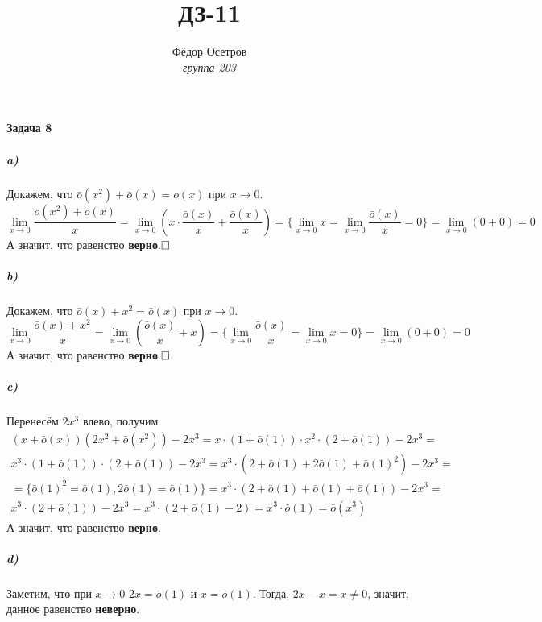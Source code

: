 \documentclass[12pt]{article}
\title{\textbf{ДЗ-11}}
\author{Фёдор Осетров\\ \textit{группа 203}}
\begin{document}
    \maketitle

    \paragraph{Задача 8}
        \subparagraph{a)}
            Докажем, что $\bar{o}(x^2) + \bar{o}(x) = o(x)$ при $x \to 0$.
            \begin{equation*}
                \lim_{x \to 0} \frac{\bar{o}(x^2) + \bar{o}(x)}{x} =
                \lim_{x \to 0} \left(x \cdot \frac{\bar{o}(x)}{x} + \frac{\bar{o}(x)}{x}\right) =
                \{\lim_{x \to 0} x = \lim_{x \to 0} \frac{\bar{o}(x)}{x} = 0\} =
                \lim_{x \to 0} \left(0 + 0\right) = 0
            \end{equation*}
            А значит, что равенство \textbf{верно}.$\hfill\square$
        \subparagraph{b)}
            Докажем, что $\bar{o}(x) + x^2 = \bar{o}(x)$ при $x \to 0$.
            \begin{equation*}
                \lim_{x \to 0} \frac{\bar{o}(x) + x^2}{x} =
                \lim_{x \to 0} \left(\frac{\bar{o}(x)}{x} + x\right) =
                \{\lim_{x \to 0} \frac{\bar{o}(x)}{x} = \lim_{x \to 0} x = 0\} =
                \lim_{x \to 0} \left(0 + 0\right) = 0
            \end{equation*}
            А значит, что равенство \textbf{верно}.$\hfill\square$
        \subparagraph{c)}
            Перенесём $2x^3$ влево, получим
            \begin{gather*}
                (x + \bar{o}(x))(2x^2 + \bar{o}(x^2)) - 2x^3 =
                x \cdot (1 + \bar{o}(1)) \cdot x^2 \cdot (2 + \bar{o}(1)) - 2x^3 =\\
                x^3 \cdot (1 + \bar{o}(1)) \cdot (2 + \bar{o}(1)) - 2x^3 =
                x^3 \cdot (2 + \bar{o}(1) + 2\bar{o}(1) + \bar{o}(1)^2) - 2x^3 =\\
                = \{\bar{o}(1)^2 = \bar{o}(1), 2\bar{o}(1) = \bar{o}(1)\} =
                x^3 \cdot (2 + \bar{o}(1) + \bar{o}(1) + \bar{o}(1)) - 2x^3 =\\
                x^3 \cdot (2 + \bar{o}(1)) - 2x^3 =
                x^3 \cdot (2 + \bar{o}(1) - 2) = x^3 \cdot \bar{o}(1) = \bar{o}(x^3)
            \end{gather*}
            А значит, что равенство \textbf{верно}.
        \subparagraph{d)}
            Заметим, что при $x \to 0$ $2x = \bar{o}(1)$ и $x = \bar{o}(1)$. Тогда,
            $2x - x = x \neq 0$, значит, данное равенство \textbf{неверно}.
\end{document}
